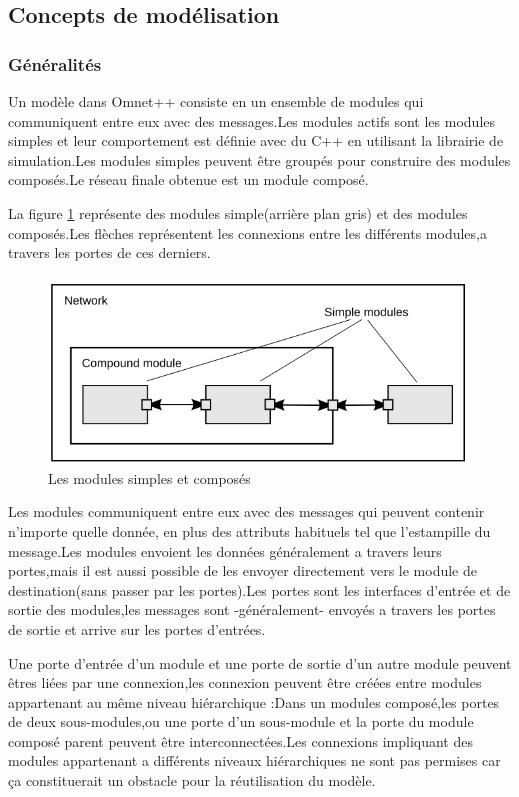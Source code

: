 \subsection{Concepts de modélisation }
\subsubsection{Généralités}
Un modèle dans Omnet++ consiste en un ensemble de modules qui communiquent entre eux avec des messages.Les modules actifs sont les modules simples et leur comportement est définie avec du C++ en utilisant la librairie de simulation.Les modules simples peuvent être groupés pour construire des modules composés.Le réseau finale obtenue est  un module composé.

La figure \ref{simpleCompound} représente des modules simple(arrière plan gris) et des modules composés.Les flèches  représentent les connexions entre les différents modules,a travers les portes de ces derniers.

\begin{figure}[!h]
\includegraphics[scale=0.7]{simpleCompound}
\caption{\label{simpleCompound}Les modules simples et composés}
\end{figure}

					
Les modules communiquent entre eux  avec des messages qui peuvent contenir n'importe quelle donnée, en plus des attributs habituels tel que l'estampille du message.Les modules envoient les données généralement a travers leurs  portes,mais il est aussi possible de les envoyer directement vers le module de destination(sans passer par les portes).Les portes sont les interfaces d'entrée et de sortie des modules,les messages sont -généralement- envoyés a travers les portes de sortie et arrive sur les portes d'entrées.

Une porte d'entrée d'un module et une porte de sortie d'un autre module peuvent êtres liées par une connexion,les connexion peuvent être créées entre modules appartenant au même niveau hiérarchique :Dans un modules composé,les portes de deux sous-modules,ou une porte d'un sous-module et la porte du module composé parent peuvent être interconnectées.Les connexions impliquant des modules appartenant a différents niveaux hiérarchiques ne sont pas permises car ça constituerait un obstacle pour la réutilisation du modèle.

